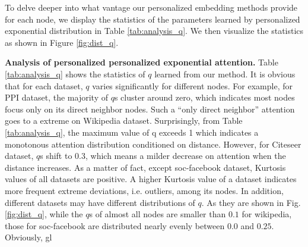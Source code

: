 \documentclass{article}
\begin{document}
To delve deeper into what vantage our personalized embedding methods provide for each node, we display the statistics of the parameters learned by personalized exponential distribution
in Table \ref{tab:analysis_q}. We then visualize the statistics as shown in Figure \ref{fig:dist_q}.

\textbf{Analysis of personalized personalized exponential attention.} 
Table \ref{tab:analysis_q} shows the statistics of $q$ learned from our method. It is obvious that for each dataset, $q$ varies significantly for different nodes. For example, for PPI dataset, the majority of $q$s cluster around zero, which indicates most nodes focus only on its direct neighbor nodes. Such a ``only direct neighbor'' attention goes to a extreme on Wikipedia dataset. Surprisingly, from Table \ref{tab:analysis_q}, the maximum value of q exceeds 1 which indicates a monotonous attention distribution conditioned on distance.
However, for Citeseer dataset, $q$s shift to 0.3, which means a milder decrease on attention when the distance increases.
As a matter of fact, except soc-facebook dataset, Kurtosis values of all datasets are positive. A higher Kurtosis value of a dataset indicates more frequent extreme deviations, i.e. outliers, among its nodes.
In addition, different datasets may have different distributions of $q$. As they are shown in Fig. \ref{fig:dist_q}, while the $q$s of almost all nodes are smaller than $0.1$ for wikipedia, those for soc-facebook are distributed nearly evenly between $0.0$ and $0.25$. Obviously, gl
\end{document}
